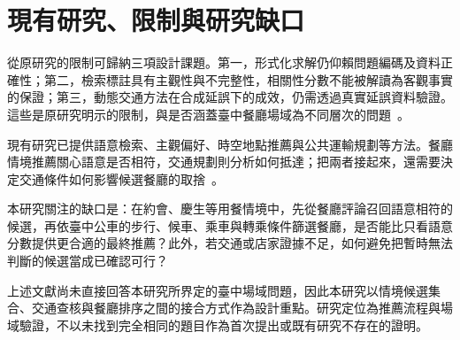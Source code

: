 \section{現有研究、限制與研究缺口}

從原研究的限制可歸納三項設計課題。第一，形式化求解仍仰賴問題編碼及資料正確性；第二，檢索標註具有主觀性與不完整性，相關性分數不能被解讀為客觀事實的保證；第三，動態交通方法在合成延誤下的成效，仍需透過真實延誤資料驗證。這些是原研究明示的限制，與是否涵蓋臺中餐廳場域為不同層次的問題~\cite{llm_planning_tools,bright,hybrid_retrieval,bus_dynamic_replanning}。

現有研究已提供語意檢索、主觀偏好、時空地點推薦與公共運輸規劃等方法。餐廳情境推薦關心語意是否相符，交通規劃則分析如何抵達；把兩者接起來，還需要決定交通條件如何影響候選餐廳的取捨~\cite{critique_preference,bus_dynamic_replanning}。

本研究關注的缺口是：在約會、慶生等用餐情境中，先從餐廳評論召回語意相符的候選，再依臺中公車的步行、候車、乘車與轉乘條件篩選餐廳，是否能比只看語意分數提供更合適的最終推薦？此外，若交通或店家證據不足，如何避免把暫時無法判斷的候選當成已確認可行？

上述文獻尚未直接回答本研究所界定的臺中場域問題，因此本研究以情境候選集合、交通查核與餐廳排序之間的接合方式作為設計重點。研究定位為推薦流程與場域驗證，不以未找到完全相同的題目作為首次提出或既有研究不存在的證明。
